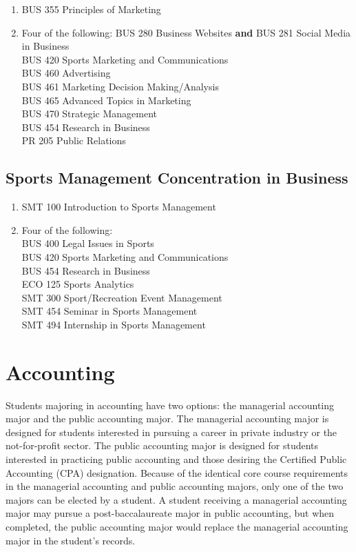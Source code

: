 \documentclass[
  letterpaper,
]{scrbook}
\providecommand{\tightlist}{%
  \setlength{\itemsep}{0pt}\setlength{\parskip}{0pt}}
\begin{document}
\begin{enumerate}
\def\labelenumi{\arabic{enumi}.}
\tightlist
\item
  BUS 355 Principles of Marketing\\
\item
  Four of the following: BUS 280 Business Websites \textbf{and} BUS 281
  Social Media in Business\\
  BUS 420 Sports Marketing and Communications\\
  BUS 460 Advertising\\
  BUS 461 Marketing Decision Making/Analysis\\
  BUS 465 Advanced Topics in Marketing\\
  BUS 470 Strategic Management\\
  BUS 454 Research in Business\\
  PR 205 Public Relations
\end{enumerate}

\subsection{Sports Management Concentration in
Business}\label{sec-sports-management-concentration}

\begin{enumerate}
\def\labelenumi{\arabic{enumi}.}
\tightlist
\item
  SMT 100 Introduction to Sports Management\\
\item
  Four of the following:\\
  BUS 400 Legal Issues in Sports\\
  BUS 420 Sports Marketing and Communications\\
  BUS 454 Research in Business\\
  ECO 125 Sports Analytics\\
  SMT 300 Sport/Recreation Event Management\\
  SMT 454 Seminar in Sports Management\\
  SMT 494 Internship in Sports Management
\end{enumerate}

\section{Accounting}\label{sec-accounting}

Students majoring in accounting have two options: the managerial
accounting major and the public accounting major. The managerial
accounting major is designed for students interested in pursuing a
career in private industry or the not-for-profit sector. The public
accounting major is designed for students interested in practicing
public accounting and those desiring the Certified Public Accounting
(CPA) designation. Because of the identical core course requirements in
the managerial accounting and public accounting majors, only one of the
two majors can be elected by a student. A student receiving a managerial
accounting major may pursue a post-baccalaureate major in public
accounting, but when completed, the public accounting major would
replace the managerial accounting major in the student's records.
\end{document}
